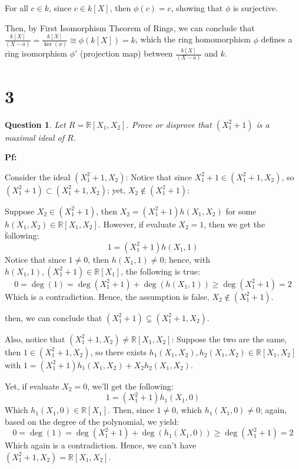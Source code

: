 \documentclass{article}
\newtheorem{question}{Question}
\begin{document}
For all $c\in k$, since $c\in k[X]$, then $\phi(c)=c$, showing that $\phi$ is surjective.

\hfill

Then, by First Isomorphism Theorem of Rings, we can conclude that $\frac{k[X]}{(X-a)}=\frac{k[X]}{\ker(\phi)}\cong \phi(k[X])=k$, 
which the ring homomorphism $\phi$ defines a ring isomorphism $\phi'$ (projection map) between $\frac{k[X]}{(X-a)}$ and $k$.

\hfill

\hfill

\section*{3}
\begin{myBox}[]{}
    \begin{question}
        Let $R = \mathbb{R}[X_1, X_2]$. Prove or disprove that $(X_1^2+1)$ is a maximal ideal of $R$.
    \end{question}
\end{myBox}

\textbf{Pf:}

Consider the ideal $(X_1^2+1,X_2)$: Notice that since $X_1^2+1\in (X_1^2+1,X_2)$, so $(X_1^2+1)\subset (X_1^2+1,X_2)$;
yet, $X_2\notin (X_1^2+1)$:

Suppose $X_2\in (X_1^2+1)$, then $X_2=(X_1^2+1)h(X_1,X_2)$ for some $h(X_1,X_2)\in \mathbb{R}[X_1,X_2]$.
However, if evaluate $X_2=1$, then we get the following:
$$1=(X_1^2+1)h(X_1,1)$$
Notice that since $1\neq 0$, then $h(X_1,1)\neq 0$; hence, with $h(X_1,1), (X_1^2+1)\in \mathbb{R}[X_1]$, the following is true:
$$0=\deg(1)=\deg(X_1^2+1)+\deg(h(X_1,1))\geq \deg(X_1^2+1) = 2$$ 
Which is a contradiction. Hence, the assumption is false, $X_2\notin (X_1^2+1)$.

then, we can conclude that $(X_1^2+1)\subsetneq (X_1^2+1,X_2)$.

\hfill

Also, notice that $(X_1^2+1,X_2)\neq \mathbb{R}[X_1,X_2]$: Suppose the two are the same, then $1\in (X_1^2+1,X_2)$, 
so there exists $h_1(X_1,X_2), h_2(X_1,X_2)\in \mathbb{R}[X_1,X_2]$ with $1=(X_1^2+1)h_1(X_1,X_2)+X_2h_2(X_1,X_2)$.

Yet, if evaluate $X_2=0$, we'll get the following:
$$1=(X_1^2+1)h_1(X_1,0)$$
Which $h_1(X_1,0)\in \mathbb{R}[X_1]$. Then, since $1\neq 0$, which $h_1(X_1,0)\neq 0$; again, based on the degree of the polynomial, we yield:
$$0=\deg(1)=\deg(X_1^2+1)+\deg(h_1(X_1,0))\geq \deg(X_1^2+1)=2$$
Which again is a contradiction. Hence, we can't have $(X_1^2+1,X_2)=\mathbb{R}[X_1,X_2]$.
\end{document}
